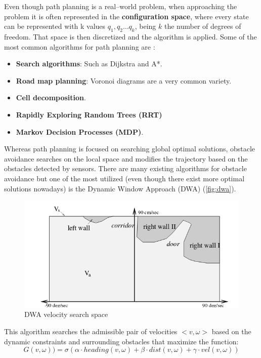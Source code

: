 Even though path planning is a real--world problem, when approaching the problem it is often represented in the \textbf{configuration space}, where every state can be represented with k values $q_1, q_2\ldots q_k$, being $k$ the number of degrees of freedom. That space is then discretized and the algorithm is applied. Some of the most common algorithms for path planning are : 
\begin{itemize}
  \item \textbf{Search algorithms}: Such as Dijkstra and A*.

  \item \textbf{Road map planning}: Voronoi diagrams are a very common variety.

  \item \textbf{Cell decomposition}.

  \item \textbf{Rapidly Exploring Random Trees (RRT)}

  \item \textbf{Markov Decision Processes (MDP)}.
\end{itemize}  

 Whereas path planning is focused on searching global optimal solutions, obstacle avoidance searches on the local space and modifies the trajectory based on the obstacles detected by sensors. There are many existing algorithms for obstacle avoidance but one of the most utilized (even though there exist more optimal solutions nowadays) is the Dynamic Window Approach (DWA)  (\autoref{fig:dwa}).

\begin{figure}[htb]
  \centering
  \includegraphics[width=.8\linewidth]{pictures/02/dwa}
  \caption{DWA velocity search space}
  \label{fig:dwa}
\end{figure} 

This algorithm searches the admissible pair of velocities $<v, \omega>$ based on the dynamic constraints and surrounding obstacles that maximize the function:
\begin{equation}
  G(v,\omega)) = \sigma(\alpha\cdot heading(v,\omega)+\beta\cdot dist(v,\omega) + \gamma\cdot vel(v,\omega))
  \label{eq:dwa}
\end{equation}  

